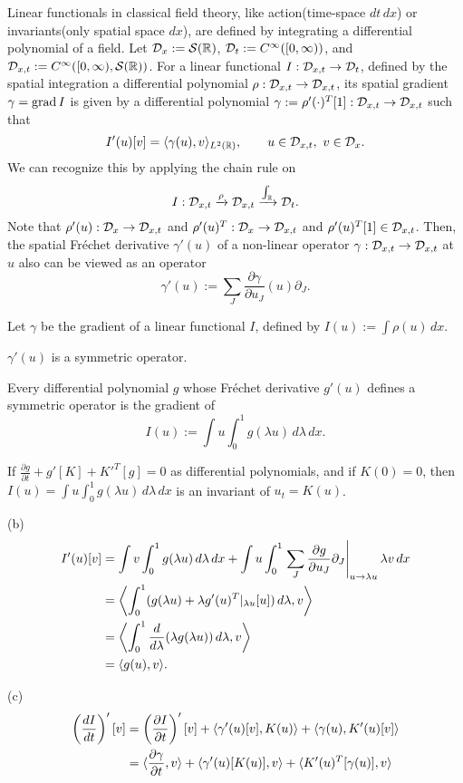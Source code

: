 \documentclass{../../../small}
\begin{document}
Linear functionals in classical field theory, like action(time-space $dt\,dx$) or invariants(only spatial space $dx$), are defined by integrating a differential polynomial of a field.
Let $\mathcal{D}_x:=\mathcal{S}(\mathbb{R})$, $\mathcal{D}_t:=C^\infty([0,\infty))$, and $\mathcal{D}_{x,t}:=C^\infty([0,\infty),\mathcal{S}(\mathbb{R}))$.
For a linear functional $I:\mathcal{D}_{x,t}\to\mathcal{D}_t$, defined by the spatial integration a differential polynomial $\rho:\mathcal{D}_{x,t}\to\mathcal{D}_{x,t}$, its spatial gradient $\gamma=\operatorname{grad} I$ is given by a differential polynomial $\gamma:=\rho'(\cdot)^T[1]:\mathcal{D}_{x,t}\to\mathcal{D}_{x,t}$ such that
\[I'(u)[v]=\langle\gamma(u),v\rangle_{L^2(\mathbb{R})},\qquad u\in\mathcal{D}_{x,t},\ v\in\mathcal{D}_x.\]
We can recognize this by applying the chain rule on
\[I:\mathcal{D}_{x,t}\xrightarrow{\rho}\mathcal{D}_{x,t}\xrightarrow{\int_{\mathbb{R}}}\mathcal{D}_t.\]
Note that $\rho'(u):\mathcal{D}_x\to\mathcal{D}_{x,t}$ and $\rho'(u)^T:\mathcal{D}_x\to\mathcal{D}_{x,t}$ and $\rho'(u)^T[1]\in\mathcal{D}_{x,t}$.
Then, the spatial Fr\'echet derivative $\gamma'(u)$ of a non-linear operator $\gamma:\mathcal{D}_{x,t}\to\mathcal{D}_{x,t}$ at $u$ also can be viewed as an operator
\[\gamma'(u):=\sum_J\frac{\partial\gamma}{\partial u_J}(u)\partial_J.\]
\begin{prop}
Let $\gamma$ be the gradient of a linear functional $I$, defined by $I(u):=\int\rho(u)\,dx$.
\begin{parts}
\item $\gamma'(u)$ is a symmetric operator.
\item Every differential polynomial $g$ whose Fr\'echet derivative $g'(u)$ defines a symmetric operator is the gradient of
\[I(u):=\int u\int_0^1g(\lambda u)\,d\lambda\,dx.\]
\item 
If $\frac{\partial g}{\partial t}+g'[K]+K'^T[g]=0$ as differential polynomials, and if $K(0)=0$, then $I(u)=\int u\int_0^1g(\lambda u)\,d\lambda\,dx$ is an invariant of $u_t=K(u)$.
\end{parts}
\end{prop}
\begin{pf}

(b)
\begin{align*}
I'(u)[v]
&=\int v\int_0^1g(\lambda u)\,d\lambda\,dx
+\int u\int_0^1\left.\sum_J\frac{\partial g}{\partial u_J}\partial_J\right|_{u\to\lambda u}\lambda v\,dx\\
&=\left<\int_0^1(g(\lambda u)+\lambda g'(u)^T|_{\lambda u}[u])\,d\lambda,v\right>\\
&=\left<\int_0^1\frac d{d\lambda}(\lambda g(\lambda u))\,d\lambda,v\right>\\
&=\langle g(u),v\rangle.
\end{align*}

(c)
\begin{align*}
\left(\frac{dI}{dt}\right)'[v]
&=\left(\frac{\partial I}{\partial t}\right)'[v]
+\langle\gamma'(u)[v],K(u)\rangle+\langle\gamma(u),K'(u)[v]\rangle\\
&=\langle\frac{\partial\gamma}{\partial t},v\rangle+\langle\gamma'(u)[K(u)],v\rangle+\langle K'(u)^T[\gamma(u)],v\rangle
\end{align*}
\end{pf}
\end{document}
